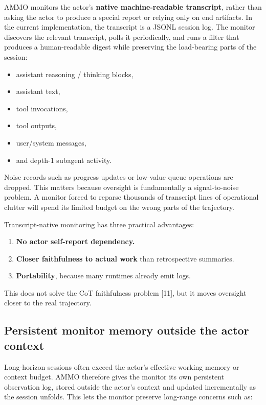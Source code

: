 \documentclass[11pt]{article}
\begin{document}
AMMO monitors the actor's \textbf{native machine-readable transcript}, rather than asking the actor to produce a special report or relying only on end artifacts. In the current implementation, the transcript is a JSONL session log. The monitor discovers the relevant transcript, polls it periodically, and runs a filter that produces a human-readable digest while preserving the load-bearing parts of the session:

\begin{itemize}[leftmargin=*,itemsep=2pt]
  \item assistant reasoning / thinking blocks,
  \item assistant text,
  \item tool invocations,
  \item tool outputs,
  \item user/system messages,
  \item and depth-1 subagent activity.
\end{itemize}

Noise records such as progress updates or low-value queue operations are dropped. This matters because oversight is fundamentally a signal-to-noise problem. A monitor forced to reparse thousands of transcript lines of operational clutter will spend its limited budget on the wrong parts of the trajectory.

Transcript-native monitoring has three practical advantages:

\begin{enumerate}[leftmargin=*,itemsep=2pt]
  \item \textbf{No actor self-report dependency.}
  \item \textbf{Closer faithfulness to actual work} than retrospective summaries.
  \item \textbf{Portability}, because many runtimes already emit logs.
\end{enumerate}

This does not solve the CoT faithfulness problem [11], but it moves oversight closer to the real trajectory.

\subsection{Persistent monitor memory outside the actor context}

Long-horizon sessions often exceed the actor's effective working memory or context budget. AMMO therefore gives the monitor its own persistent observation log, stored outside the actor's context and updated incrementally as the session unfolds. This lets the monitor preserve long-range concerns such as:
\end{document}
